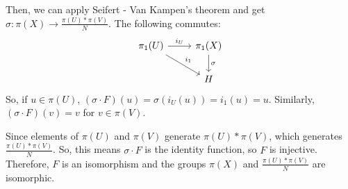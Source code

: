\documentclass[8pt]{beamer}
\begin{document}
\begin{frame}
\begin{columns}
\begin{column}[T]{0.5\textwidth}
\begin{itemize}
            Then, we can apply Seifert - Van Kampen's theorem and get $\sigma : \pi(X) \rightarrow \frac{\pi(U)*\pi(V)}{N}$.
            The following commutes:
            \[\begin{tikzcd}[ampersand replacement=\&]
                \pi_1(U) \ar[rd, "i_1"] \ar[r, "i_U"] \&
                \pi_1(X) \ar[d, "\sigma"] \\ \& H \end{tikzcd}\]
            So, if $u \in \pi(U)$, $(\sigma \cdot F)(u) = \sigma(i_U(u))=i_1(u)
            = u$. Similarly, $(\sigma \cdot F)(v) = v$ for $v \in \pi(V)$.

            Since elements of $\pi(U)$ and $\pi(V)$ generate $\pi(U)*\pi(V)$,
            which generates $\frac{\pi(U)*\pi(V)}{N}$. So, this means $\sigma
            \cdot F$ is the identity function, so $F$ is injective. Therefore,
            $F$ is an isomorphism and the groups $\pi(X)$ and $\frac{\pi(U)*
            \pi(V)}{N}$ are isomorphic.
        \end{itemize}
      \end{column}
    \end{columns}
  \end{frame}
            
\end{document}
